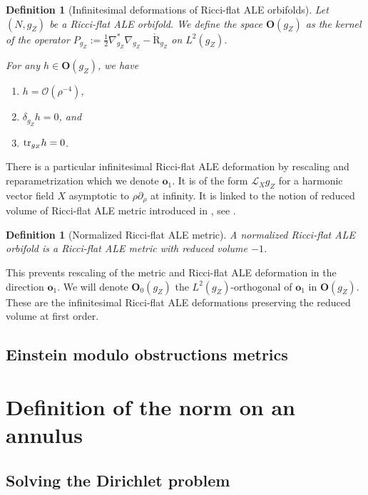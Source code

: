 \documentclass[12pt]{article}
\newtheorem{defn}[thm]{Definition}
\begin{document}
\begin{defn}[Infinitesimal deformations of Ricci-flat ALE orbifolds]
    Let $(N,{g_Z})$ be a Ricci-flat ALE orbifold. We define the space $\mathbf{O}({g_Z})$ as the kernel of the operator $P_{{g_Z}}:= \frac{1}{2}\nabla_{{g_Z}}^*\nabla_{{g_Z}} - \mathring{\mathrm{R}}_{{g_Z}}$ on $L^2({g_Z})$.
    
    For any $h\in \mathbf{O}({g_Z})$, we have
    \begin{enumerate}
        \item $h = \mathcal{O}(\rho^{-4})$,
        \item $\delta_{{g_Z}}h=0$, and
        \item $ \textup{tr}_{{g_Z}}h=0 $.
    \end{enumerate}
\end{defn}
There is a particular infinitesimal Ricci-flat ALE deformation by rescaling and reparametrization which we denote $\mathbf{o}_1$. It is of the form $\mathcal{L}_{X}{g_Z}$ for a harmonic vector field $X$ asymptotic to $\rho\partial_{\rho}$ at infinity. It is linked to the notion of reduced volume of Ricci-flat ALE metric introduced in \cite{bh}, see \cite{ozu4}.
\begin{defn}[Normalized Ricci-flat ALE metric]
    A \emph{normalized Ricci-flat ALE orbifold} is a Ricci-flat ALE metric with reduced volume $-1$. 
\end{defn}
This prevents rescaling of the metric and Ricci-flat ALE deformation in the direction $\mathbf{o}_1$. We will denote $\mathbf{O}_0({g_Z})$ the $L^2({g_Z})$-orthogonal of $ \mathbf{o}_1 $ in $\mathbf{O}({g_Z})$. These are the infinitesimal Ricci-flat ALE deformations preserving the reduced volume at first order.

\subsection{Einstein modulo obstructions metrics}
    


\section{Definition of the norm on an annulus}

    
    \subsection{Solving the Dirichlet problem}
    
\end{document}

